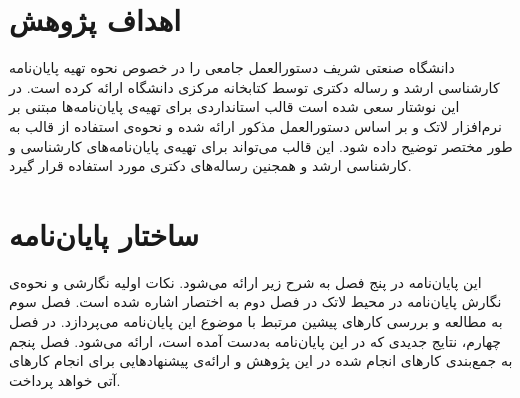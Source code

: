 \section{اهداف پژوهش}

دانشگاه صنعتی شریف دستورالعمل جامعی را در خصوص
نحوه تهیه پایان‌نامه کارشناسی ارشد و رساله دکتری توسط کتابخانه مرکزی دانشگاه ارائه کرده است.
در این نوشتار سعی شده است قالب استانداردی برای تهیه‌ی پایان‌نامه‌ها مبتنی بر نرم‌افزار لاتک و
بر اساس دستورالعمل مذکور ارائه شده و
نحوه‌ی استفاده از قالب به طور مختصر توضیح داده شود.
این قالب  می‌تواند برای تهیه‌ی پایان‌نامه‌های کارشناسی و کارشناسی ارشد
و همجنین رساله‌ها‌ی دکتری مورد استفاده قرار گیرد.

\section{ساختار پایان‌نامه}

این پایان‌نامه در پنج فصل به شرح زیر ارائه می‌شود.
نکات اولیه نگارشی و نحوه‌ی نگارش پایان‌نامه در محیط لاتک در  فصل دوم به اختصار اشاره شده است.
فصل سوم به مطالعه و بررسی کارهای پیشین مرتبط با موضوع این پایان‌نامه می‌پردازد.
در فصل چهارم، نتایج جدیدی که در این پایان‌نامه به‌دست آمده است، ارائه می‌شود.
فصل پنجم به جمع‌بندی کارهای انجام شده در این پژوهش و ارائه‌ی پیشنهادهایی برای انجام کارهای آتی خواهد پرداخت.